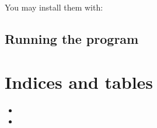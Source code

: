 \documentclass[letterpaper,10pt,english]{sphinxmanual}
\begin{document}
You may install them with:

\begin{sphinxVerbatim}[commandchars=\\\{\}]
    
\end{sphinxVerbatim}


\section{Running the program}
\label{getting_started:running-the-program}

\chapter{Indices and tables}
\label{index:indices-and-tables}\begin{itemize}
\item {} 

\item {} 

\end{itemize}



\renewcommand{\indexname}{Index}
\printindex
\end{document}
